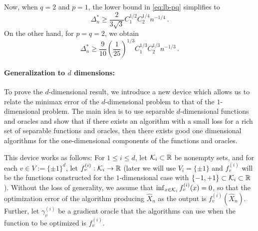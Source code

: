 Now, when $q=2$ and $p=1$, the lower bound in \eqref{eq:lb-pq} simplifies to 
\[
\Delta_n^{*} \ge \dfrac{ 2}{3\sqrt{3}} C_1^{1/2}C_2^{1/4} n^{-1/4} \,.
\]
On the other hand, for $p=q=2$, we obtain 
\[
\Delta_n^{*} \ge  \frac{9}{10}\left(\frac{1}{25}\right)^{1/3}C_1^{1/3}C_2^{1/3} n^{-1/3}\,.
\]


\paragraph{Generalization to $d$ dimensions:}
To prove the $d$-dimensional result, we introduce a new device which allows us to relate the minimax error of the $d$-dimensional problem to that of the $1$-dimensional problem.
The main idea is to use separable $d$-dimensional functions and oracles and show that if there exists an algorithm with a small loss for a rich set of separable functions and oracles, then there exists good one dimensional algorithms for the one-dimensional components of the functions and oracles.

This device works as follows: 
For $1\le i \le d$, let $\mathcal{K}_i \subset \mathbb{R}$ be nonempty sets, 
and for each $v\in V := \{\pm 1\}^d$, let $f_v^{(i)}: \mathcal{K}_i \to \mathbb{R}$ 
(later we will use $V_i=\{\pm 1\}$ and $f_v^{(i)}$ will be the functions constructed for the $1$-dimensional case with $\{-1,+1\}\subset \mathcal{K}_i\subset \mathbb{R}$).
Without the loss of generality, we assume that $\inf_{x\in \mathcal{K}_i} f_v^{(i)}(x) = 0$, so that the optimization error of the algorithm producing $\hat{X}_n$  as the output is $f_v^{(i)}(\hat{X}_n)$.
Further, let $\gamma_v^{(i)}$ be a gradient oracle that the algorithms can use when 
the function to be optimized is $f_v^{(i)}$. 

